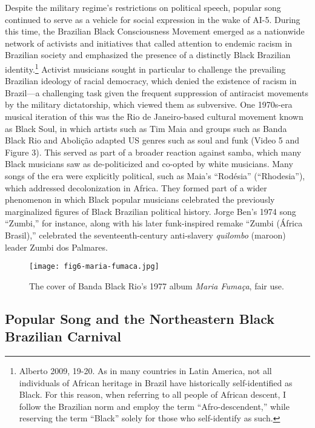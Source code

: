\documentclass[twoside]{article}
\begin{document}
Despite the military regime's restrictions on political speech, popular
song continued to serve as a vehicle for social expression in the wake
of AI-5. During this time, the Brazilian Black Consciousness Movement
emerged as a nationwide network of activists and initiatives that called
attention to endemic racism in Brazilian society and emphasized the
presence of a distinctly Black Brazilian identity.\footnote{Alberto
  2009, 19-20. As in many countries in Latin America, not all
  individuals of African heritage in Brazil have historically
  self-identified as Black. For this reason, when referring to all
  people of African descent, I follow the Brazilian norm and employ the
  term ``Afro-descendent,'' while reserving the term ``Black'' solely
  for those who self-identify as such.} Activist musicians sought in
particular to challenge the prevailing Brazilian ideology of racial
democracy, which denied the existence of racism in Brazil---a
challenging task given the frequent suppression of antiracist movements
by the military dictatorship, which viewed them as subversive. One
1970s-era musical iteration of this was the Rio de Janeiro-based
cultural movement known as Black Soul, in which artists such as Tim Maia
and groups such as Banda Black Rio and Abolição adapted US genres such
as soul and funk (Video 5 and Figure 3). This served as part of a
broader reaction against samba, which many Black musicians saw as
de-politicized and co-opted by white musicians. Many songs of the era
were explicitly political, such as Maia's ``Rodésia'' (``Rhodesia''),
which addressed decolonization in Africa. They formed part of a wider
phenomenon in which Black popular musicians celebrated the previously
marginalized figures of Black Brazilian political history. Jorge Ben's
1974 song ``Zumbi,'' for instance, along with his later funk-inspired
remake ``Zumbi (África Brasil),'' celebrated the seventeenth-century
anti-slavery \emph{quilombo} (maroon) leader Zumbi dos Palmares.

\begin{figure}
  \texttt{[image: fig6-maria-fumaca.jpg]}
  \caption{The cover of Banda Black Rio's 1977 album \emph{Maria Fumaça}, fair use.}
\end{figure}

\hypertarget{popular-song-and-the-northeastern-black-brazilian-carnival}{%
\subsection*{Popular Song and the Northeastern Black Brazilian
Carnival}\label{popular-song-and-the-northeastern-black-brazilian-carnival}}
\end{document}

